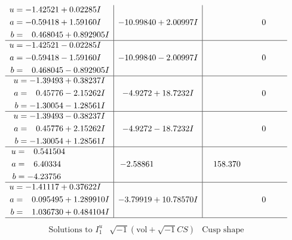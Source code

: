 \documentclass[1p]{elsarticle_modified}
\theoremstyle{definition}
\newcommand{\I}{\sqrt{-1}}
\begin{document}
$$\begin{array}{c|c|c}
\begin{aligned}
u &= -1.42521 + 0.02285 I \\
a &= -0.59418 + 1.59160 I \\
b &= \phantom{-}0.468045 + 0.892905 I\end{aligned}
 & -10.99840 + 2.00997 I & \phantom{-0.000000 } 0 \\ \hline\begin{aligned}
u &= -1.42521 - 0.02285 I \\
a &= -0.59418 - 1.59160 I \\
b &= \phantom{-}0.468045 - 0.892905 I\end{aligned}
 & -10.99840 - 2.00997 I & \phantom{-0.000000 } 0 \\ \hline\begin{aligned}
u &= -1.39493 + 0.38237 I \\
a &= \phantom{-}0.45776 - 2.15262 I \\
b &= -1.30054 - 1.28561 I\end{aligned}
 & -4.9272 + 18.7232 I & \phantom{-0.000000 } 0 \\ \hline\begin{aligned}
u &= -1.39493 - 0.38237 I \\
a &= \phantom{-}0.45776 + 2.15262 I \\
b &= -1.30054 + 1.28561 I\end{aligned}
 & -4.9272 - 18.7232 I & \phantom{-0.000000 } 0 \\ \hline\begin{aligned}
u &= \phantom{-}0.541504\phantom{ +0.000000I} \\
a &= \phantom{-}6.40334\phantom{ +0.000000I} \\
b &= -4.23756\phantom{ +0.000000I}\end{aligned}
 & -2.58861\phantom{ +0.000000I} & \phantom{-}158.370\phantom{ +0.000000I} \\ \hline\begin{aligned}
u &= -1.41117 + 0.37622 I \\
a &= \phantom{-}0.095495 + 1.289910 I \\
b &= \phantom{-}1.036730 + 0.484104 I\end{aligned}
 & -3.79919 + 10.78570 I & \phantom{-0.000000 } 0\\
 \hline 
 \end{array}$$\newpage$$\begin{array}{c|c|c}  
\text{Solutions to }I^u_{1}& \I (\text{vol} + \sqrt{-1}CS) & \text{Cusp shape}\\
 \hline 
\begin{aligned}

\end{aligned}
\end{array}$$
\end{document}
